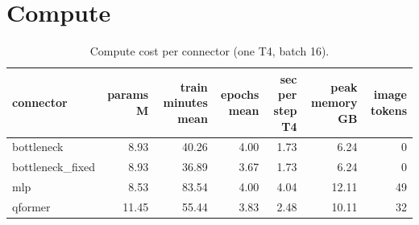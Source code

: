 \documentclass[10pt]{article}
\begin{document}
\section{Compute}
\begin{longtable}{lrrrrrr}
\caption{Compute cost per connector (one T4, batch 16).}\label{tab:s-compute}\\
\toprule
connector & params M & train minutes mean & epochs mean & sec per step T4 & peak memory GB & image tokens \\ \midrule
\endhead
bottleneck & 8.93 & 40.26 & 4.00 & 1.73 & 6.24 & 0 \\
bottleneck\_fixed & 8.93 & 36.89 & 3.67 & 1.73 & 6.24 & 0 \\
mlp & 8.53 & 83.54 & 4.00 & 4.04 & 12.11 & 49 \\
qformer & 11.45 & 55.44 & 3.83 & 2.48 & 10.11 & 32 \\
\bottomrule
\end{longtable}
\end{document}
